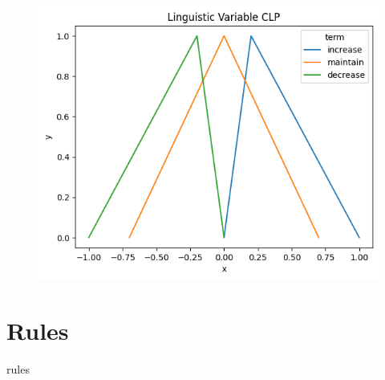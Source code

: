 \documentclass[11pt]{report}
\begin{document}
\begin{figure}

\includegraphics{CLP.png}
\end{figure}

\section{Rules}
rules
\end{document}
